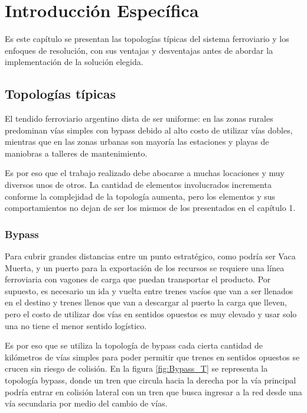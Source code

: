 \chapter{Introducción Específica} %

\label{Chapter2}

Es este capítulo se presentan las topologías típicas del sistema ferroviario y los enfoques de resolución, con sus ventajas y desventajas antes de abordar la implementación de la solución elegida.

\section{Topologías típicas}
\label{Topologias}	
	El tendido ferroviario argentino dista de ser uniforme: en las zonas rurales predominan vías simples con bypass debido al alto costo de utilizar vías dobles, mientras que en las zonas urbanas son mayoría las estaciones y playas de maniobras a talleres de mantenimiento.
	
	Es por eso que el trabajo realizado debe abocarse a muchas locaciones y muy diversos unos de otros. La cantidad de elementos involucrados incrementa conforme la complejidad de la topología aumenta, pero los elementos y sus comportamientos no dejan de ser los mismos de los presentados en el capítulo 1.

	\subsection{Bypass}

		Para cubrir grandes distancias entre un punto estratégico, como podría ser Vaca Muerta, y un puerto para la exportación de los recursos se requiere una línea ferroviaria con vagones de carga que puedan transportar el producto. Por supuesto, es necesario un ida y vuelta entre trenes vacíos que van a ser llenados en el destino y trenes llenos que van a descargar al puerto la carga que lleven, pero el costo de utilizar dos vías en sentidos opuestos es muy elevado y usar solo una no tiene el menor sentido logístico.
		
		Es por eso que se utiliza la topología de bypass cada cierta cantidad de kilómetros de vías simples para poder permitir que trenes en sentidos opuestos se crucen sin riesgo de colisión. En la figura \ref{fig:Bypass_T} se representa la topología bypass, donde un tren que circula hacia la derecha por la vía principal podría entrar en colisión lateral con un tren que busca ingresar a la red desde una vía secundaria por medio del cambio de vías.
		
